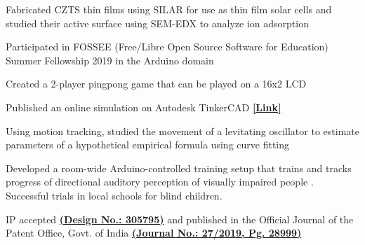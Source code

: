 \documentclass[]{psyqe-resume-openfont}
\begin{document}
\begin{minipage}[t]{0.65\textwidth}
\begin{tightemize}
\item Fabricated CZTS thin films using SILAR for use as thin film solar cells and studied their active surface using SEM-EDX to analyze ion adsorption \cite{Guha2021}
\end{tightemize}
\sectionsep

\begin{tightemize}
\item Participated in FOSSEE (Free/Libre Open Source Software for Education) Summer Fellowship 2019 in the Arduino domain
\item Created a 2-player pingpong game that can be played on a 16x2 LCD
\item Published an online simulation on Autodesk TinkerCAD \textbf{\href{https://www.tinkercad.com/things/cL2SogHJobn?sharecode=Nf75LAH15eyD5xEGsSbnSdjyj0kpy9A-UC08TDohg8E}{[Link]}}
\end{tightemize}
\sectionsep

\begin{tightemize}
\item Using motion tracking, studied the movement of a levitating oscillator to estimate parameters of a hypothetical empirical formula using curve fitting
\end{tightemize}
\sectionsep

\begin{tightemize}
\item Developed a room-wide Arduino-controlled training setup that trains and tracks progress of directional auditory perception of visually impaired people \cite{Prasad2019}. Successful trials in local schools for blind children.
\item IP accepted \textbf{\href{https://search.ipindia.gov.in/DesignApplicationStatus}{(Design No.: 305795)}} and published in the Official Journal of the Patent Office, Govt. of India \textbf{\href{https://search.ipindia.gov.in/IPOJournal/Journal/Patent}{(Journal No.: 27/2019, Pg. 28999)}} \cite{Design2019}
\end{tightemize}
\sectionsep


\end{minipage}
\end{document}

